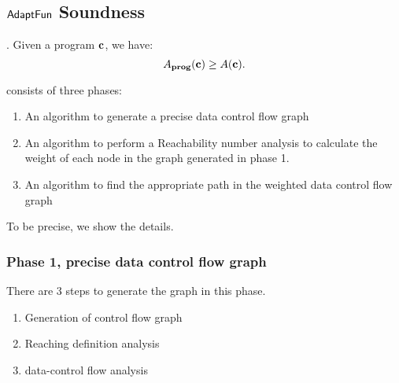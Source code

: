 \subsection{$\textsf{AdaptFun}$ Soundness}
{
  \begin{thm}.
  Given a program ${\boldsymbol{\mathbf{c}}}$, we have:
  \[
  A_{\bf{prog}}({\boldsymbol{\mathbf{c}}}) \geq A({\boldsymbol{\mathbf{c}}}).
  \]
  \end{thm}
}



{\THESYSTEM} consists of three phases: 
\begin{enumerate}
    \item An algorithm to generate a precise data control flow graph
    \item An algorithm to perform a Reachability number analysis to calculate the weight of each node in the graph generated in phase 1.
    \item An algorithm to find the appropriate path in the weighted data control flow graph
\end{enumerate}

To be precise, we show the details. 
\subsubsection{Phase 1, precise data control flow graph}
There are 3 steps to generate the graph in this phase.
\begin{enumerate}
\item Generation of control flow graph
    \item Reaching definition analysis
   \item  data-control flow analysis
\end{enumerate}

